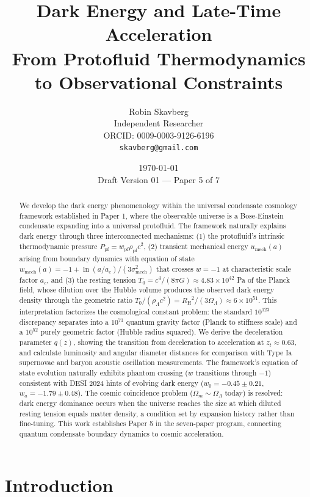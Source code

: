 \documentclass[11pt,a4paper]{article}
\title{\textbf{Dark Energy and Late-Time Acceleration}\\[0.5em]
\large From Protofluid Thermodynamics to Observational Constraints}
\author{Robin Skavberg\\[0.3em]
\small Independent Researcher\\
\small ORCID: 0009-0003-9126-6196\\
\small \texttt{skavberg@gmail.com}}
\date{\today\\[0.5em]
\small Draft Version 01 --- Paper 5 of 7}
\newcommand{\Tzero}{\ensuremath{T_0}}
\newcommand{\RH}{\ensuremath{R_{\mathrm{H}}}}
\newcommand{\umech}{\ensuremath{u_{\mathrm{mech}}}}
\newcommand{\wmech}{\ensuremath{w_{\mathrm{mech}}}}
\newcommand{\wpf}{\ensuremath{w_{\mathrm{pf}}}}
\newcommand{\Ppf}{\ensuremath{P_{\mathrm{pf}}}}
\newcommand{\rhopf}{\ensuremath{\rho_{\mathrm{pf}}}}
\newcommand{\OmegaLam}{\ensuremath{\Omega_\Lambda}}
\newcommand{\OmegaM}{\ensuremath{\Omega_m}}
\theoremstyle{definition}
\theoremstyle{remark}
\begin{document}
\maketitle

\begin{abstract}
We develop the dark energy phenomenology within the universal condensate cosmology framework established in Paper 1, where the observable universe is a Bose-Einstein condensate expanding into a universal protofluid. The framework naturally explains dark energy through three interconnected mechanisms: (1) the protofluid's intrinsic thermodynamic pressure $\Ppf = \wpf \rhopf c^2$, (2) transient mechanical energy $\umech(a)$ arising from boundary dynamics with equation of state $\wmech(a) = -1 + \ln(a/a_c)/(3\sigma_{\mathrm{mech}}^2)$ that crosses $w = -1$ at characteristic scale factor $a_c$, and (3) the resting tension $\Tzero = c^4/(8\pi G) \approx 4.83 \times 10^{42}$ Pa of the Planck field, whose dilution over the Hubble volume produces the observed dark energy density through the geometric ratio $\Tzero/(\rho_\Lambda c^2) = \RH^2/(3\OmegaLam) \approx 6 \times 10^{51}$. This interpretation factorizes the cosmological constant problem: the standard $10^{123}$ discrepancy separates into a $10^{71}$ quantum gravity factor (Planck to stiffness scale) and a $10^{52}$ purely geometric factor (Hubble radius squared). We derive the deceleration parameter $q(z)$, showing the transition from deceleration to acceleration at $z_t \approx 0.63$, and calculate luminosity and angular diameter distances for comparison with Type Ia supernovae and baryon acoustic oscillation measurements. The framework's equation of state evolution naturally exhibits phantom crossing ($w$ transitions through $-1$) consistent with DESI 2024 hints of evolving dark energy ($w_0 = -0.45 \pm 0.21$, $w_a = -1.79 \pm 0.48$). The cosmic coincidence problem ($\OmegaM \sim \OmegaLam$ today) is resolved: dark energy dominance occurs when the universe reaches the size at which diluted resting tension equals matter density, a condition set by expansion history rather than fine-tuning. This work establishes Paper 5 in the seven-paper program, connecting quantum condensate boundary dynamics to cosmic acceleration.
\end{abstract}

\tableofcontents
\newpage

\section{Introduction}
\label{sec:introduction}
\end{document}
